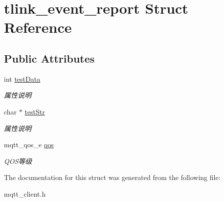 \hypertarget{structtlink__event__report}{}\section{tlink\+\_\+event\+\_\+report Struct Reference}
\label{structtlink__event__report}
\subsection*{Public Attributes}
\begin{DoxyCompactItemize}
\item 
\mbox{\label{structtlink__event__report_a8473b0b5956cb01306b2139400a4fd04}} 
int \mbox{\hyperlink{structtlink__event__report_a8473b0b5956cb01306b2139400a4fd04}{test\+Data}}
\begin{DoxyCompactList}\small\item\em 属性说明 \end{DoxyCompactList}\item 
\mbox{\label{structtlink__event__report_a3bc9a22881c99db419e533b49deffbdc}} 
char $\ast$ \mbox{\hyperlink{structtlink__event__report_a3bc9a22881c99db419e533b49deffbdc}{test\+Str}}
\begin{DoxyCompactList}\small\item\em 属性说明 \end{DoxyCompactList}\item 
\mbox{\label{structtlink__event__report_abc901545868b9e72a0082265c71ad693}} 
mqtt\+\_\+qos\+\_\+e \mbox{\hyperlink{structtlink__event__report_abc901545868b9e72a0082265c71ad693}{qos}}
\begin{DoxyCompactList}\small\item\em Q\+O\+S等级 \end{DoxyCompactList}\end{DoxyCompactItemize}


The documentation for this struct was generated from the following file\+:\begin{DoxyCompactItemize}
\item 
mqtt\+\_\+client.\+h\end{DoxyCompactItemize}
